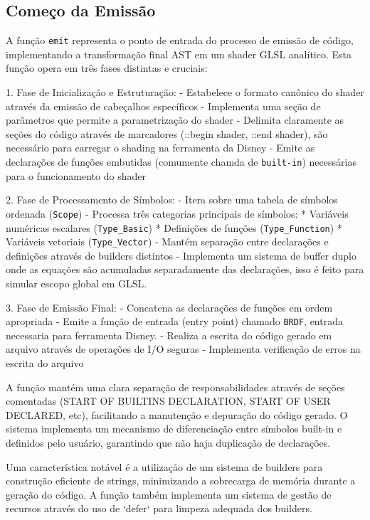 \subsection{Começo da Emissão}%
\label{sub:start-emitting}

A função \verb`emit` representa o ponto de entrada do processo de emissão de código, implementando a transformação final AST em um shader GLSL analítico. Esta função opera em três fases distintas e cruciais:

1. Fase de Inicialização e Estruturação:
   - Estabelece o formato canônico do shader através da emissão de cabeçalhos específicos
   - Implementa uma seção de parâmetros que permite a parametrização do shader
   - Delimita claramente as seções do código através de marcadores (::begin shader, ::end shader), são necessário para carregar o shading na ferramenta da Disney
   - Emite as declarações de funções embutidas (comumente chamda de \verb`built-in`) necessárias para o funcionamento do shader

2. Fase de Processamento de Símbolos:
   - Itera sobre uma tabela de símbolos ordenada (\verb"Scope")
   - Processa três categorias principais de símbolos:
     * Variáveis numéricas escalares (\verb"Type_Basic")
     * Definições de funções (\verb"Type_Function")
     * Variáveis vetoriais (\verb"Type_Vector")
   - Mantém separação entre declarações e definições através de builders distintos
   - Implementa um sistema de buffer duplo onde as equações são acumuladas separadamente das declarações, isso é feito para simular escopo global em GLSL.

3. Fase de Emissão Final:
   - Concatena as declarações de funções em ordem apropriada
   - Emite a função de entrada (entry point) chamado \verb`BRDF`, entrada necessaria para ferramenta Disney.
   - Realiza a escrita do código gerado em arquivo através de operações de I/O seguras
   - Implementa verificação de erros na escrita do arquivo

A função mantém uma clara separação de responsabilidades através de seções comentadas (START OF BUILTINS DECLARATION, START OF USER DECLARED, etc), facilitando a manutenção e depuração do código gerado. O sistema implementa um mecanismo de diferenciação entre símbolos built-in e definidos pelo usuário, garantindo que não haja duplicação de declarações.

Uma característica notável é a utilização de um sistema de builders para construção eficiente de strings, minimizando a sobrecarga de memória durante a geração do código. A função também implementa um sistema de gestão de recursos através do uso de `defer` para limpeza adequada dos builders.

